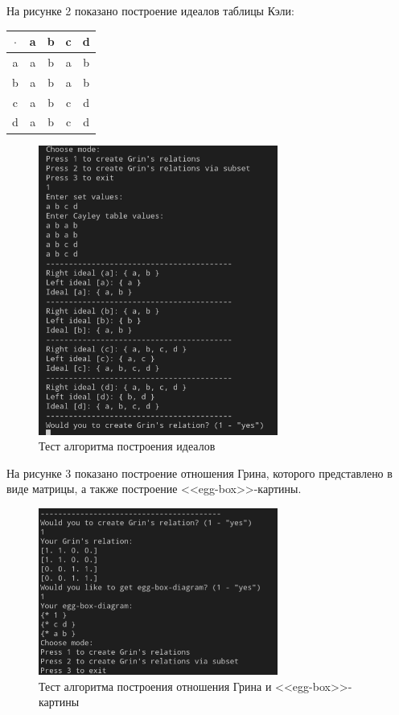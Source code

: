 \documentclass[bachelor, och, labwork]{shiza}
\begin{document}
      На рисунке 2 показано построение идеалов таблицы Кэли:

      \begin{table}[H]
        \centering
        \begin{tabular}{|c|c|c|c|c|}
        \hline
        $\cdot$ & a & b & c & d \\ \hline
        a & a & b & a & b \\ \hline
        b & a & b & a & b \\ \hline
        c & a & b & c & d \\ \hline
        d & a & b & c & d \\ \hline
    \end{tabular}
    \end{table}

      \begin{figure}[H]
        \centering
        \includegraphics[width=0.7\textwidth]{photo/2.png}
        \caption{Тест алгоритма построения идеалов}
      \end{figure}

      На рисунке 3 показано построение отношения Грина, которого представлено в виде матрицы, а также построение <<egg-box>>-картины.

      \begin{figure}[H]
        \centering
        \includegraphics[width=0.7\textwidth]{photo/3.png}
        \caption{Тест алгоритма построения отношения Грина и <<egg-box>>-картины}
      \end{figure}
\end{document}
